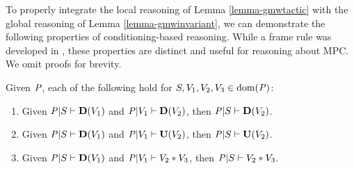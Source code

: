 To properly integrate the local reasoning of Lemma \ref{lemma-gmwtactic} with
the global reasoning of Lemma \ref{lemma-gmwinvariant}, we can demonstrate
the following properties of conditioning-based reasoning. While a frame rule
was developed in \cite{li2023lilac}, these properties are distinct and
useful for reasoning about MPC. We omit proofs for brevity. 
\begin{lemma}
  \label{lemma-conditioning}
  Given $\mathit{P}$, each of the following hold for $S,V_1,V_2,V_3 \in \mathrm{dom}(\mathit{P})$:
  \begin{enumerate}
    \item Given $\mathit{P}|S \vdash \mathbf{D}(V_1)$ and
      $\mathit{P}|V_1 \vdash \mathbf{D}(V_2)$, then $\mathit{P}|S \vdash \mathbf{D}(V_2)$.
    \item Given $\mathit{P}|S \vdash \mathbf{D}(V_1)$ and
      $\mathit{P}|V_1 \vdash \mathbf{U}(V_2)$, then $\mathit{P}|S \vdash \mathbf{U}(V_2)$.
    \item Given $\mathit{P}|S \vdash \mathbf{D}(V_1)$ and
      $\mathit{P}|V_1 \vdash V_2 * V_3$, then $\mathit{P}|S \vdash V_2 * V_3$.
  \end{enumerate}
\end{lemma}

